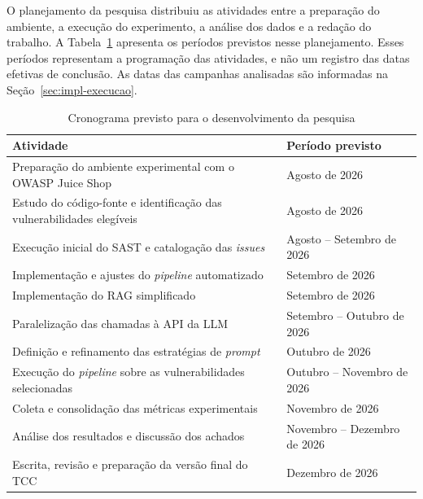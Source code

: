 O planejamento da pesquisa distribuiu as atividades entre a preparação do ambiente, a execução do experimento, a análise dos dados e a redação do trabalho. A Tabela~\ref{tab:cronograma} apresenta os períodos previstos nesse planejamento. Esses períodos representam a programação das atividades, e não um registro das datas efetivas de conclusão. As datas das campanhas analisadas são informadas na Seção~\ref{sec:impl-execucao}.

\begin{table}[H]
\centering
\caption{Cronograma previsto para o desenvolvimento da pesquisa}
\label{tab:cronograma}
\renewcommand{\arraystretch}{1.35}
\begin{tabularx}{\textwidth}{|>{\raggedright\arraybackslash}X|>{\centering\arraybackslash}p{}|}
\hline
\textbf{Atividade} & \textbf{Período previsto} \\
\hline
Preparação do ambiente experimental com o OWASP Juice Shop & Agosto de 2026 \\
\hline
Estudo do código-fonte e identificação das vulnerabilidades elegíveis & Agosto de 2026 \\
\hline
Execução inicial do SAST e catalogação das \textit{issues} & Agosto -- Setembro de 2026 \\
\hline
Implementação e ajustes do \textit{pipeline} automatizado & Setembro de 2026 \\
\hline
Implementação do RAG simplificado & Setembro de 2026 \\
\hline
Paralelização das chamadas à API da LLM & Setembro -- Outubro de 2026 \\
\hline
Definição e refinamento das estratégias de \textit{prompt} & Outubro de 2026 \\
\hline
Execução do \textit{pipeline} sobre as vulnerabilidades selecionadas & Outubro -- Novembro de 2026 \\
\hline
Coleta e consolidação das métricas experimentais & Novembro de 2026 \\
\hline
Análise dos resultados e discussão dos achados & Novembro -- Dezembro de 2026 \\
\hline
Escrita, revisão e preparação da versão final do TCC & Dezembro de 2026 \\
\hline
\end{tabularx}
\end{table}
